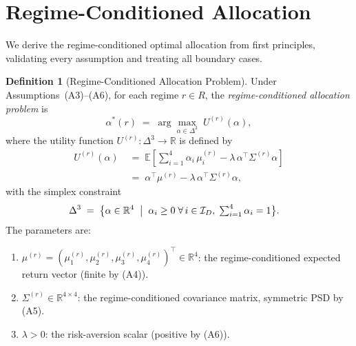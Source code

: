 \documentclass[12pt,openany]{book}
\newcommand{\R}{\mathbb{R}}
\newcommand{\E}{\mathbb{E}}
\numberwithin{equation}{chapter}
\theoremstyle{plain}
\theoremstyle{definition}
\newtheorem{definition}[theorem]{Definition}
\theoremstyle{remark}
\numberwithin{equation}{chapter}
\theoremstyle{plain}
\newcommand{\calR}{\mathcal{R}}
\def\calR{R}%
\begin{document}
\section{Regime-Conditioned Allocation}
\label{sec:regime-alloc}

\noindent We derive the regime-conditioned optimal allocation from first
principles, validating every assumption and treating all boundary cases.

\begin{definition}[Regime-Conditioned Allocation Problem]
\label{def:regime-alloc}
Under Assumptions~(A3)--(A6), for each regime $r \in \calR$, the
\emph{regime-conditioned allocation problem} is
\begin{equation}
  \alpha^{*}(r) \;=\;
  \arg\max_{\alpha \in \Delta^{3}}\; U^{(r)}(\alpha),
  \label{eq:regime-alloc-argmax}
\end{equation}
where the utility function $U^{(r)} : \Delta^{3} \to \R$ is defined by
\begin{align}
  U^{(r)}(\alpha)
  &\;=\; \E\!\left[
    \sum_{i=1}^{4} \alpha_i\,\mu_i^{(r)}
    - \lambda\,\alpha^\top \Sigma^{(r)} \alpha
  \right]
  \label{eq:utility-full} \\[4pt]
  &\;=\; \alpha^\top \mu^{(r)}
         - \lambda\,\alpha^\top \Sigma^{(r)} \alpha,
  \label{eq:utility-compact}
\end{align}
with the simplex constraint
\begin{align}
  \Delta^{3}
  &\;=\; \bigl\{
    \alpha \in \R^4 \;\bigm|\;
    \alpha_i \geq 0 \;\forall\, i \in \mathcal{I}_D,\;
    \textstyle\sum_{i=1}^{4} \alpha_i = 1
  \bigr\}.
  \label{eq:simplex-def}
\end{align}
The parameters are:
\begin{enumerate}
  \item $\mu^{(r)} = (\mu_1^{(r)}, \mu_2^{(r)}, \mu_3^{(r)},
        \mu_4^{(r)})^\top \in \R^4$: the regime-conditioned expected
        return vector (finite by (A4)).
  \item $\Sigma^{(r)} \in \R^{4\times 4}$: the regime-conditioned
        covariance matrix, symmetric PSD by (A5).
  \item $\lambda > 0$: the risk-aversion scalar (positive by (A6)).
\end{enumerate}
\end{definition}
\end{document}
